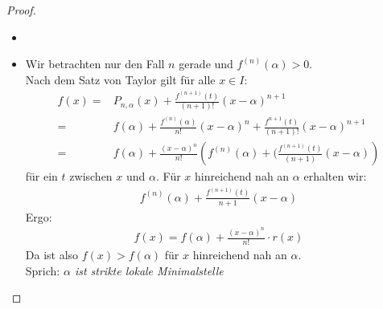 \begin{proof}
	\begin{itemize}
		\item[ ]
			\item Wir betrachten nur den Fall $n$ gerade und 
			$f^{(n)}(\alpha) > 0$.\\
			 Nach dem Satz von Taylor gilt für alle $x \in I$: 
			\begin{align*}
				f(x) = & P_{n, \alpha}(x) + \frac{f^{(n+1)}(t)}{(n+1)!}
				(x- \alpha)^{n+1} \\
				= & f(\alpha) + \frac{f^{(n)}(\alpha)}{n!}
				(x - \alpha)^n + \frac{f^{n+1}(t)}{(n+1)!}(x- \alpha)^{n+1} \\
				= & f(\alpha) + \frac{(x- \alpha)^n}{n!}\left( f^{(n)}(\alpha) 
				+ (\frac{f^{(n+1)}(t)}{(n+1)}(x-\alpha)\right)
			\end{align*}
			für ein $t$ zwischen $x$ und $\alpha$. Für $x$ hinreichend nah an $\alpha$ 
			erhalten wir: 
			\begin{align*}
				f^{(n)}(\alpha) + \frac{f^{(n+1)}(t)}{n+1}(x-\alpha)			
			\end{align*}
			Ergo:
			\begin{align*}
				f(x) = f(\alpha) + \frac{(x- \alpha)^n}{n!} \cdot r(x)
			\end{align*}
			Da ist also $f(x) > f(\alpha)$ für $x$ hinreichend nah an $\alpha$. \\
			Sprich: \textit{$\alpha$ ist strikte lokale Minimalstelle}
	\end{itemize}
\end{proof}
